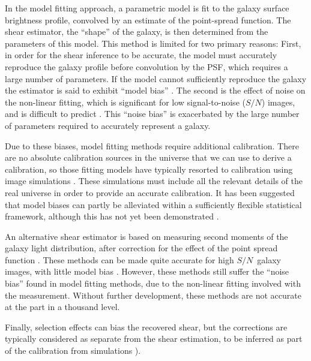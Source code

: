 \documentclass[iop]{emulateapj}
\newcommand{\snr}{$S/N$}
\begin{document}
In the model fitting approach, a parametric model is fit to the galaxy surface
brightness profile, convolved by an estimate of the point-spread function.
The shear estimator, the ``shape'' of the galaxy, is then determined
from the parameters of this model.  This method is limited for two primary
reasons: First, in order for the shear inference to be accurate, the model
must accurately reproduce the galaxy profile before convolution by the
PSF, which requires a large number of parameters.  If the model
cannot sufficiently reproduce the galaxy the estimator is said to exhibit
``model bias'' \citep{Bernstein2010}.  The second is the effect of noise
on the non-linear fitting, which is significant for low signal-to-noise (\snr)
images, and is difficult to predict
\citep{HirataAlign04,Refreg12,Melchior12}.  This ``noise bias'' is exacerbated
by the large number of parameters required to accurately represent a galaxy.

Due to these biases, model fitting methods require additional calibration.
There are no absolute calibration sources in the universe that we can use to
derive a calibration, so those fitting models have typically resorted to
calibration using image simulations
\citep[e.g.][]{Zuntz13,Miller13,KidsShear2016,Refregier13}.  These simulations
must include all the relevant details of the real universe in order to provide
an accurate calibration.  It has been suggested that model biases can partly be
alleviated within a sufficiently flexible statistical framework, although
this has not yet been demonstrated \citep{SchneiderProbshear2015}.

An alternative shear estimator is based on measuring second moments of the
galaxy light distribution, after correction for the effect of the point spread
function \citep[e.g.][]{ksb95,Bernstein2010}.  These methods can be made quite
accurate for high \snr\ galaxy images, with little model bias
\citep{Bernstein2010,Okura2016}.  However, these methods still suffer the
``noise bias'' found in model fitting methods, due to the non-linear fitting
involved with the measurement.  Without further development, these methods are
not accurate at the part in a thousand level.

Finally, selection effects can bias the recovered shear, but the corrections
are typically considered as separate from the shear estimation, to be inferred
as part of the calibration from simulations \citep{Jarvis2016,KidsShear2016}).
\end{document}
